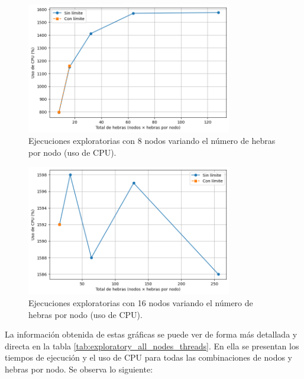 \begin{figure}[ht]
    \centering
    \includegraphics[width=0.8\textwidth]{imagenes/cap5/exploratory_threads_8nodes_cpu.png}
    \caption{Ejecuciones exploratorias con 8 nodos variando el número de hebras por nodo (uso de CPU).}
    \label{fig:exploratory_threads_8nodes_cpu}
\end{figure}

\begin{figure}[ht]
    \centering
    \includegraphics[width=0.8\textwidth]{imagenes/cap5/exploratory_threads_16nodes_cpu.png}
    \caption{Ejecuciones exploratorias con 16 nodos variando el número de hebras por nodo (uso de CPU).}
    \label{fig:exploratory_threads_16nodes_cpu}
\end{figure}

La información obtenida de estas gráficas se puede ver de forma más detallada y directa en la tabla \ref{tab:exploratory_all_nodes_threads}. En ella se presentan los tiempos de ejecución y el uso de CPU para todas las combinaciones de nodos y hebras por nodo. Se observa lo siguiente:

